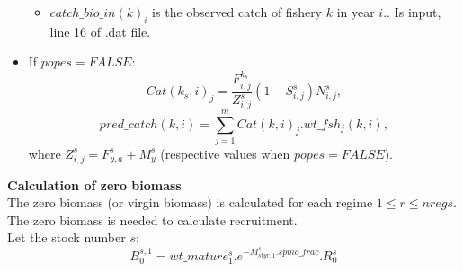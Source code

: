 \documentclass{article}
\begin{document}
\begin{itemize}
\begin{itemize}
        \item $catch\_bio\_in(k)_i$ is the observed catch of fishery $k$ in year $i$.. Is input, line 16 of .dat file. 
 
\end{itemize}
    \item If $popes=FALSE$:
     \begin{equation}
        Cat(k_s,i)_j=\dfrac{F^{k_s}_{i,j}}{Z^s_{i,j}}\left(1-S^s_{i,j}\right)N^s_{i,j},
    \end{equation}
      \begin{equation}
        pred\_catch(k,i)=\sum_{j=1}^{m}Cat(k,i)_j.wt\_fsh_j(k,i),
    \end{equation}
        where $Z^s_{i,j}=F^s_{y,a}+M^{s}_{y}$ 
 (respective values when $popes=FALSE$).
        
    
\end{itemize}
\textbf{Calculation of zero biomass}\\
The zero biomass (or virgin biomass) is calculated for each regime $1\leq r \leq  nregs$. The zero biomass is needed to calculate recruitment.\\
Let the stock number $s$:
\begin{equation}
    B^{s,1}_0=wt\_mature^s_1.e^{-M^s_{styr,1}.spmo\_frac}.R^s_0
\end{equation}
\end{document}
